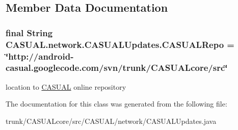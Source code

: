 \subsection{Member Data Documentation}
\hypertarget{classCASUAL_1_1network_1_1CASUALUpdates_af94f8633399fb6aaf79d1c0a23458b21}{
\subsubsection[{C\-A\-S\-U\-A\-L\-Repo}]{\setlength{\rightskip}{0pt plus 5cm}final String C\-A\-S\-U\-A\-L.\-network.\-C\-A\-S\-U\-A\-L\-Updates.\-C\-A\-S\-U\-A\-L\-Repo = \char`\"{}http\-://android-\/casual.\-googlecode.\-com/svn/trunk/C\-A\-S\-U\-A\-Lcore/src\char`\"{}}}\label{classCASUAL_1_1network_1_1CASUALUpdates_af94f8633399fb6aaf79d1c0a23458b21}
location to \hyperlink{namespaceCASUAL}{C\-A\-S\-U\-A\-L} online repository 

The documentation for this class was generated from the following file\-:\begin{DoxyCompactItemize}
\item 
trunk/\-C\-A\-S\-U\-A\-Lcore/src/\-C\-A\-S\-U\-A\-L/network/C\-A\-S\-U\-A\-L\-Updates.\-java\end{DoxyCompactItemize}
